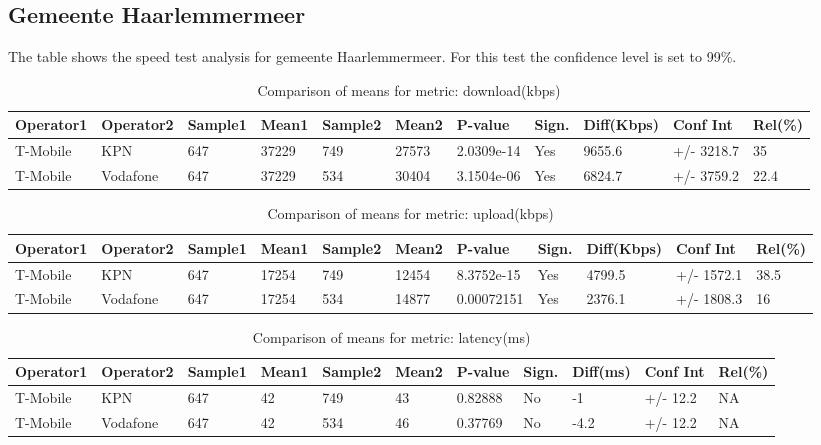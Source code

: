 \documentclass[]{article}
\begin{document}
\normalsize

\newpage

\subsection{Gemeente Haarlemmermeer}\label{gemeente-haarlemmermeer}

The table shows the speed test analysis for gemeente Haarlemmermeer. For
this test the confidence level is set to 99\%.

\begin{table}[ht]
\centering
{\footnotesize
\begin{tabular}{lllllllllll}
  \hline
Operator1 & Operator2 & Sample1 & Mean1 & Sample2 & Mean2 & P-value & Sign. & Diff(Kbps) & Conf Int & Rel(\%) \\ 
  \hline
T-Mobile & KPN & 647 & 37229 & 749 & 27573 & 2.0309e-14 & Yes & 9655.6 & +/- 3218.7 & 35 \\ 
  T-Mobile & Vodafone & 647 & 37229 & 534 & 30404 & 3.1504e-06 & Yes & 6824.7 & +/- 3759.2 & 22.4 \\ 
   \hline
\end{tabular}
}
\caption{Comparison of means for metric: download(kbps)} 
\end{table}\begin{table}[ht]
\centering
{\footnotesize
\begin{tabular}{lllllllllll}
  \hline
Operator1 & Operator2 & Sample1 & Mean1 & Sample2 & Mean2 & P-value & Sign. & Diff(Kbps) & Conf Int & Rel(\%) \\ 
  \hline
T-Mobile & KPN & 647 & 17254 & 749 & 12454 & 8.3752e-15 & Yes & 4799.5 & +/- 1572.1 & 38.5 \\ 
  T-Mobile & Vodafone & 647 & 17254 & 534 & 14877 & 0.00072151 & Yes & 2376.1 & +/- 1808.3 & 16 \\ 
   \hline
\end{tabular}
}
\caption{Comparison of means for metric: upload(kbps)} 
\end{table}\begin{table}[ht]
\centering
{\footnotesize
\begin{tabular}{lllllllllll}
  \hline
Operator1 & Operator2 & Sample1 & Mean1 & Sample2 & Mean2 & P-value & Sign. & Diff(ms) & Conf Int & Rel(\%) \\ 
  \hline
T-Mobile & KPN & 647 & 42 & 749 & 43 & 0.82888 & No & -1 & +/- 12.2 & NA \\ 
  T-Mobile & Vodafone & 647 & 42 & 534 & 46 & 0.37769 & No & -4.2 & +/- 12.2 & NA \\ 
   \hline
\end{tabular}
}
\caption{Comparison of means for metric: latency(ms)} 
\end{table}
\end{document}
